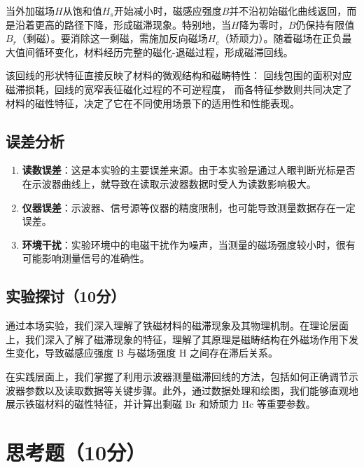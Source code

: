 \documentclass[]{../template/Report}%
\begin{document}
\begin{fullreportonly}
当外加磁场$H$从饱和值$H_s$开始减小时，磁感应强度$B$并不沿初始磁化曲线返回，而是沿着更高的路径下降，形成磁滞现象。特别地，当$H$降为零时，$B$仍保持有限值$B_r$（剩磁）。要消除这一剩磁，需施加反向磁场$H_c$（矫顽力）。随着磁场在正负最大值间循环变化，材料经历完整的磁化-退磁过程，形成磁滞回线。

该回线的形状特征直接反映了材料的微观结构和磁畴特性：
回线包围的面积对应磁滞损耗，回线的宽窄表征磁化过程的不可逆程度，
而各特征参数则共同决定了材料的磁性特征，决定了它在不同使用场景下的适用性和性能表现。
\subsection{误差分析}
\begin{enumerate}
    \item \textbf{读数误差}：这是本实验的主要误差来源。由于本实验是通过人眼判断光标是否在示波器曲线上，就导致在读取示波器数据时受人为读数影响极大。
    \item \textbf{仪器误差}：示波器、信号源等仪器的精度限制，也可能导致测量数据存在一定误差。
    \item \textbf{环境干扰}：实验环境中的电磁干扰作为噪声，当测量的磁场强度较小时，很有可能影响测量信号的准确性。
\end{enumerate}

\subsection{实验探讨（10分）}
通过本场实验，我们深入理解了铁磁材料的磁滞现象及其物理机制。在理论层面上，我们深入了解了磁滞现象的特征，理解了其原理是磁畴结构在外磁场作用下发生变化，导致磁感应强度 B 与磁场强度 H 之间存在滞后关系。

在实践层面上，我们掌握了利用示波器测量磁滞回线的方法，包括如何正确调节示波器参数以及读取数据等关键步骤。此外，通过数据处理和绘图，我们能够直观地展示铁磁材料的磁性特征，并计算出剩磁 Br 和矫顽力 Hc 等重要参数。


\section{思考题（10分）}

\end{fullreportonly}
\end{document}
